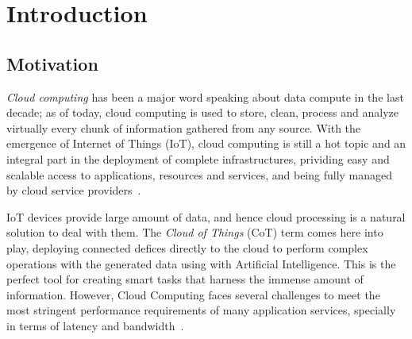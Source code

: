 
\cleardoublepage


\chapter{Introduction}
\label{makereference}



\section{Motivation}
\label{makereference1.1}

{\em Cloud computing} has been a major word speaking about data compute in the last decade; as of today, cloud computing is used to store, clean, process and analyze virtually every chunk of information gathered from any source.
%
With the emergence of Internet of Things (IoT), cloud computing is still a hot topic and an integral part in the deployment of complete infrastructures, prividing easy and scalable access to applications, resources and services, and being fully managed by  cloud service providers~\cite{cloud_def}.

IoT devices provide large amount of data, and hence cloud processing is a natural solution to deal with them. 
%
The {\em Cloud of Things} (CoT) term comes here into play,  deploying connected defices directly to the cloud to perform complex operations with the generated data using with Artificial Intelligence. This is the perfect tool for creating smart tasks that harness the immense amount of information.
%
However, Cloud Computing faces several challenges to meet the most stringent performance requirements of many application services, specially in terms of latency and bandwidth~\cite{IEE:Morabito:2017}.

